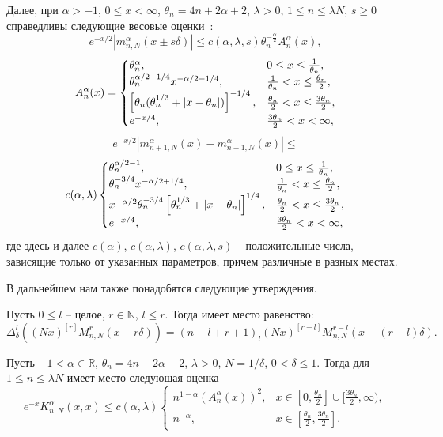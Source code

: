 Далее, при $\alpha>-1$, $0\le x<\infty$, $\theta_n=4n+2\alpha+2$, $\lambda>0$, $1\le n\le \lambda N$, $s\geq0$ справедливы следующие весовые оценки~\cite{Ram-SharBook}:
\begin{equation*}
e^{-x/2}\left|m_{n,N}^\alpha(x\pm s\delta)\right|\le c(\alpha,\lambda,s)\theta_n^{-\frac{\alpha}{2}}A_n^\alpha(x),
\end{equation*}
\begin{equation*}
A_n^\alpha(x)=\begin{cases}
\theta_n^{\alpha},&  0\le x\le \frac{1}{\theta_n},\\
\theta_n^{\alpha/2-1/4}x^{-\alpha/2-1/4},&     \frac{1}{\theta_n}<x\le {\theta_n\over 2},\\
\left[\theta_n(\theta_n^{1/3}+|x-\theta_n|)\right]^{-1/4},& {\theta_n\over2}<x\leq{3\theta_n\over2},\\
e^{-x/4}, & {3\theta_n\over2}<x<\infty,
\end{cases}
\end{equation*}
$$
e^{-x/2}\left|m_{n+1,N}^{\alpha}(x)-m_{n-1,N}^{\alpha}(x)\right|\leq
$$
\begin{equation*}
c(\alpha,\lambda)\begin{cases}
\theta_n^{\alpha/2-1},&  0\le x\le \frac{1}{\theta_n},\\
\theta_n^{-3/4}x^{-\alpha/2+1/4},&     \frac{1}{\theta_n}<x\le {\theta_n\over 2},\\
x^{-\alpha/2}\theta_n^{-3/4}\left[\theta_n^{1/3}+|x-\theta_n|\right]^{1/4},& {\theta_n\over2}<x\leq{3\theta_n\over2},\\
e^{-x/4}, & {3\theta_n\over2}<x<\infty,
\end{cases}
\end{equation*}
где здесь и далее $c(\alpha)$, $c(\alpha, \lambda)$, $c(\alpha, \lambda, s)$ -- положительные числа, зависящие только от указанных параметров, причем различные в разных местах.

В дальнейшем нам также понадобятся следующие утверждения.
\begin{lemma}
Пусть $0\le l$ -- целое, $r\in\mathbb{N}$, $l\le r$. Тогда имеет место равенство:
\begin{equation*}
\Delta^l_\delta\left((Nx)^{[r]}M^r_{n,N}(x-r\delta)\right)=(n-l+r+1)_l(Nx)^{[r-l]}M^{r-l}_{n,N}(x-(r-l)\delta).
\end{equation*}
\end{lemma}

\begin{lemma}
Пусть $-1<\alpha\in\mathbb{R}$, $\theta_n=4n+2\alpha+2$, $\lambda>0$, $N=1/\delta$, $0<\delta\leq1$. Тогда для $1\leq n\leq \lambda N$ имеет место следующая оценка
\begin{equation*}
e^{-x}K_{n,N}^\alpha(x,x)\le c(\alpha,\lambda)
\begin{cases}
n^{1-\alpha}(A_n^\alpha(x))^2, & x\in[0,\frac{\theta_n}{2}]\cup[\frac{3\theta_n}{2},\infty), \\
n^{-\alpha}, & x\in[\frac{\theta_n}{2},\frac{3\theta_n}{2}].
\end{cases}
\end{equation*}
\end{lemma}

